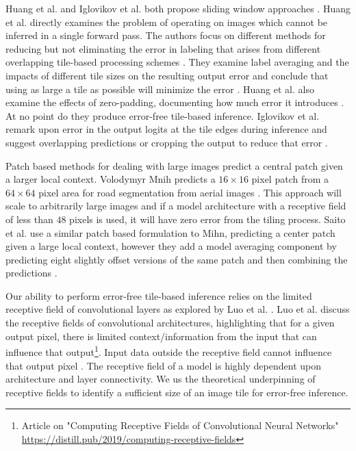 \documentclass[runningheads]{llncs}
\begin{document}
Huang et al. and Iglovikov et al. both propose sliding window approaches \cite{Huang2019a,Iglovikov2017}.  Huang et al. directly examines the problem of operating on images which cannot be inferred in a single forward pass. The authors focus on different methods for reducing but not eliminating the error in labeling that arises from different overlapping tile-based processing schemes \cite{Huang2019a}. They examine label averaging and the impacts of different tile sizes on the resulting output error and conclude that using as large a tile as possible will minimize the error \cite{Huang2019a}. Huang et al. also examine the effects of zero-padding, documenting how much error it introduces \cite{Huang2019a}. At no point do they produce error-free tile-based inference. Iglovikov et al. remark upon error in the output logits at the tile edges during inference and suggest overlapping predictions or cropping the output to reduce that error \cite{Iglovikov2017}. 

Patch based methods for dealing with large images predict a central patch given a larger local context. Volodymyr Mnih predicts a $16 \times 16$ pixel patch from a $64 \times 64$ pixel area for road segmentation from aerial images \cite{Mnih2013}. This approach will scale to arbitrarily large images and if a model architecture with a receptive field of less than $48$ pixels is used, it will have zero error from the tiling process. Saito et al. use a similar patch based formulation to Mihn, predicting a center patch given a large local context, however they add a model averaging component by predicting eight slightly offset versions of the same patch and then combining the predictions \cite{Saito2016}.

Our ability to perform error-free tile-based inference relies on the limited receptive field of convolutional layers as explored by Luo et al. \cite{Luo2016}. Luo et al. \cite{Luo2016} discuss the receptive fields of convolutional architectures, highlighting that for a given output pixel, there is limited context/information from the input that can influence that output\footnote{Article on "Computing Receptive Fields of Convolutional Neural Networks" \cite{araujo2019computing} \url{https://distill.pub/2019/computing-receptive-fields}}. Input data outside the receptive field cannot influence that output pixel \cite{Luo2016}. The receptive field of a model is highly dependent upon architecture and layer connectivity. We us the theoretical underpinning of receptive fields to identify a sufficient size of an image tile for error-free inference.  
\end{document}
